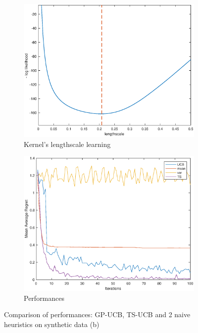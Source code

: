 \documentclass{article} %
\begin{document}
\begin{figure}[h!]
  \begin{subfigure}[b]{0.5\linewidth}
    \centering 
    \includegraphics[width=1\linewidth]{figures/synthetic_lengthscale_learning.eps} 
    \caption{Kernel's lengthscale learning} 
    \label{kernel_learning} 
    \vspace{4ex}
  \end{subfigure}
  \begin{subfigure}[b]{0.5\linewidth}
    \centering
    \includegraphics[width=1\linewidth]{figures/synthetic_MC_150_kernel_sqe.eps} 
    \caption{Performances} 
    \label{synthetic_data} 
    \vspace{4ex}
  \end{subfigure} 
 \caption{Comparison of performances: GP-UCB, TS-UCB and 2 naive heuristics on synthetic data (b)} 
 \label{results_synthetic} 
\end{figure}
\end{document}
